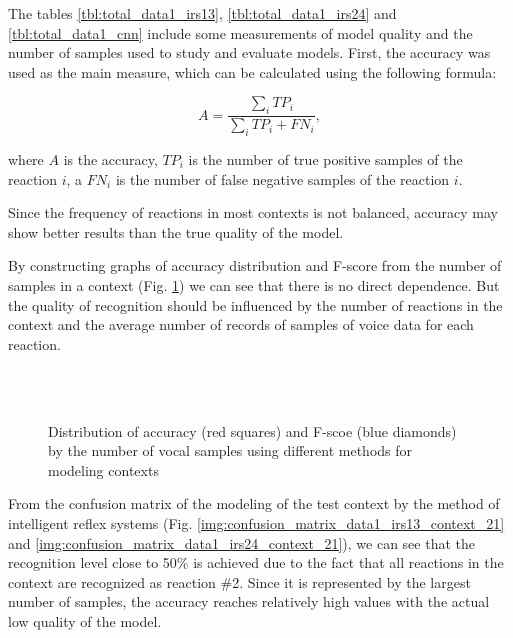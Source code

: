 The tables \ref{tbl:total_data1_irs13}, \ref{tbl:total_data1_irs24} and \ref{tbl:total_data1_cnn} include some measurements of model quality and the number of samples used to study and evaluate models. First, the accuracy \cite{Ting_2011} was used as the main measure, which can be calculated using the following formula:

\begin{equation}
\label{eq:acuracy}
A=\frac{\sum\limits_i TP_i}{\sum\limits_i TP_i+FN_i},
\end{equation}

where $A$ is the accuracy, $TP_i$ is the number of true positive samples of the reaction $i$, a $FN_i$ is the number of false negative samples of the reaction $i$.

Since the frequency of reactions in most contexts is not balanced, accuracy may show better results than the true quality of the model.

By constructing graphs of accuracy distribution and F-score from the number of samples in a context (Fig. \ref{img:accuracy_distribution_data1}) we can see that there is no direct dependence. But the quality of recognition should be influenced by the number of reactions in the context and the average number of records of samples of voice data for each reaction.

\begin{figure}[!t]
	\centering
	\\
	\\
	\caption{Distribution of accuracy (red squares) and F-scoe (blue diamonds) by the number of vocal samples using different methods for modeling contexts}
	\label{img:accuracy_distribution_data1}
\end{figure}

From the confusion matrix \cite{Stehman_1997} of the modeling of the test context by the method of intelligent reflex systems (Fig. \ref{img:confusion_matrix_data1_irs13_context_21} and \ref{img:confusion_matrix_data1_irs24_context_21}), we can see that the recognition level close to 50\% is achieved due to the fact that all reactions in the context are recognized as reaction \#2. Since it is represented by the largest number of samples, the accuracy reaches relatively high values with the actual low quality of the model.

